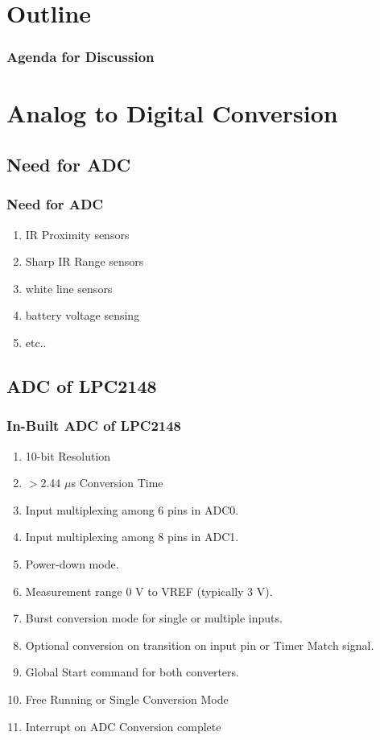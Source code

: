 \documentclass[table,10pt,red]{beamer}
\title
[
	Firebird LPC2148 Robotics Research Platform	%
	\hspace{0.5cm}
	\insertframenumber/\inserttotalframenumber
]
{
	Using ADC on Firebird-V Robot
}
\author
[
	www.e-yantra.org
]
{
	e-Yantra Team \\
  Embedded Real-Time Systems Lab\\
  Indian Institute of Technology-Bombay \\
}
\date
{
IIT Bombay \\ {\today}
}
\begin{document}
 

\begin{frame}
	\titlepage
\end{frame} 

\section*{Outline}
\begin{frame}
	\frametitle{Agenda for Discussion}
	\tableofcontents
\end{frame} 


\section{Analog to Digital Conversion}
\subsection{Need for ADC}
\begin{frame}
	\frametitle{Need for ADC}
	\begin{enumerate}[$\checkmark$] \pause
		\item <+-|alert@+> IR Proximity sensors 
		\item <+-|alert@+> Sharp IR Range sensors
		\item <+-|alert@+> white line sensors
		\item <+-|alert@+> battery voltage sensing
		\item <+-|alert@+> etc.. 
	\end{enumerate}
\end{frame}

\subsection{ADC of LPC2148}
\begin{frame}
	\frametitle{In-Built ADC of LPC2148} \pause
	\begin{enumerate}[$\checkmark$]
		\item <+-|alert@+> 10-bit Resolution
		\item <+-|alert@+> $>$2.44 $\mu$s Conversion Time
		\item <+-|alert@+> Input multiplexing among 6 pins in ADC0.
		\item <+-|alert@+> Input multiplexing among 8 pins in ADC1.
		\item <+-|alert@+> Power-down mode.
		\item <+-|alert@+> Measurement range 0 V to VREF (typically 3 V).
		\item <+-|alert@+> Burst conversion mode for single or multiple inputs.
		\item <+-|alert@+> Optional conversion on transition on input pin or Timer Match signal.
		\item <+-|alert@+> Global Start command for both converters.
		\item <+-|alert@+> Free Running or Single Conversion Mode
		\item <+-|alert@+> Interrupt on ADC Conversion complete
	\end{enumerate}
\end{frame}	
	
\end{document}
